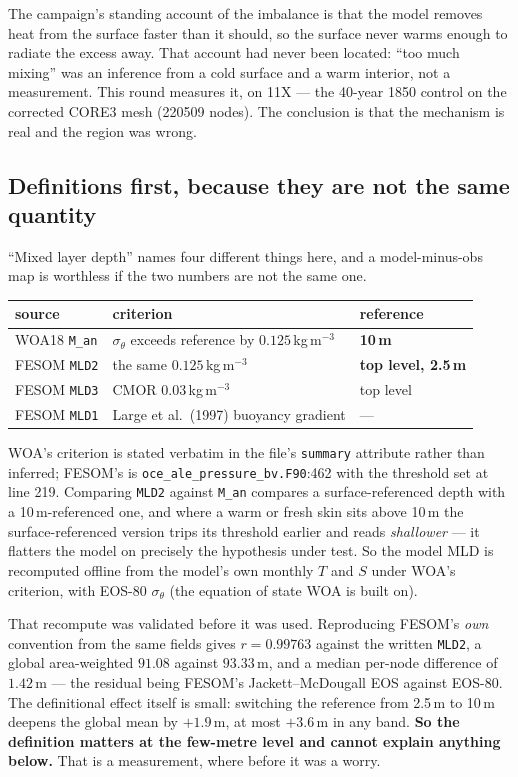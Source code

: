 \documentclass[10pt]{article}
\begin{document}
The campaign's standing account of the imbalance is that the model removes heat from the
surface faster than it should, so the surface never warms enough to radiate the excess away.
That account had never been located: ``too much mixing'' was an inference from a cold surface
and a warm interior, not a measurement. This round measures it, on 11X --- the 40-year 1850
control on the corrected CORE3 mesh (220509 nodes). The conclusion is that the mechanism is
real and the region was wrong.

\subsection{Definitions first, because they are not the same quantity}\label{sub:r35defs}
``Mixed layer depth'' names four different things here, and a model-minus-obs map is
worthless if the two numbers are not the same one.

\begin{center}\small
\begin{tabular}{lll}
\toprule
source & criterion & reference \\
\midrule
WOA18 \texttt{M\_an} & $\sigma_\theta$ exceeds reference by $0.125$\,kg\,m$^{-3}$ & \textbf{10\,m} \\
FESOM \texttt{MLD2} & the same $0.125$\,kg\,m$^{-3}$ & \textbf{top level, 2.5\,m} \\
FESOM \texttt{MLD3} & CMOR $0.03$\,kg\,m$^{-3}$ & top level \\
FESOM \texttt{MLD1} & Large et al.\ (1997) buoyancy gradient & --- \\
\bottomrule
\end{tabular}
\end{center}

\noindent WOA's criterion is stated verbatim in the file's \texttt{summary} attribute rather
than inferred; FESOM's is \texttt{oce\_ale\_pressure\_bv.F90}:462 with the threshold set at
line 219. Comparing \texttt{MLD2} against \texttt{M\_an} compares a surface-referenced depth
with a 10\,m-referenced one, and where a warm or fresh skin sits above 10\,m the
surface-referenced version trips its threshold earlier and reads \emph{shallower} --- it
flatters the model on precisely the hypothesis under test. So the model MLD is recomputed
offline from the model's own monthly $T$ and $S$ under WOA's criterion, with EOS-80
$\sigma_\theta$ (the equation of state WOA is built on).

That recompute was validated before it was used. Reproducing FESOM's \emph{own} convention
from the same fields gives $r=0.99763$ against the written \texttt{MLD2}, a global
area-weighted $91.08$ against $93.33$\,m, and a median per-node difference of $1.42$\,m ---
the residual being FESOM's Jackett--McDougall EOS against EOS-80. The definitional effect
itself is small: switching the reference from 2.5\,m to 10\,m deepens the global mean by
$+1.9$\,m, at most $+3.6$\,m in any band. \textbf{So the definition matters at the
few-metre level and cannot explain anything below.} That is a measurement, where before it
was a worry.
\end{document}
